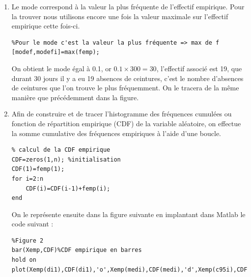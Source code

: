 \documentclass[a4paper,oneside]{article}
\begin{document}
\begin{enumerate}
\begin{lstlisting}
[maxX,maxXi]=max(Xemp); %on récupère le max des fréquence, ainsi que l'indice de ce max
[minX,minXi]=min(Xemp);
\end{lstlisting}

Nous utiliserons cet indice pour le tracer dans la figure avec la valeur maximale en abscisse, et la valeur de l'effectif empirique correspondante.
On obtient le minimum égal à 7 c'est-à-dire qu'au minimum il y a eu 7 absences de ceinture et qu'au maximum il y a eu 30 absences de ceinture de sécurité.\\

\item

Le mode correspond à la valeur la plus fréquente de l'effectif empirique.
Pour la trouver nous utilisons encore une fois la valeur maximale sur l'effectif empirique cette fois-ci.

\begin{lstlisting}
%Pour le mode c'est la valeur la plus fréquente => max de f
[modef,modefi]=max(femp);
\end{lstlisting}

On obtient le mode égal à 0.1, or $0.1\times 300 =30$, l'effectif associé est 19, que durant 30 jours il y a eu 19 absences de ceintures, c'est le nombre d'absences de ceintures que l'on trouve le plus fréquemment.
On le tracera de la même manière que précédemment dans la figure.\\

\item

Afin de construire et de tracer l'histogramme des fréquences cumulées ou fonction de répartition empirique (CDF) de la variable aléatoire, on effectue la somme cumulative des fréquences empiriques à l'aide d'une boucle.

\begin{lstlisting}
% calcul de la CDF empirique
CDF=zeros(1,n); %initialisation
CDF(1)=femp(1);
for i=2:n
    CDF(i)=CDF(i-1)+femp(i);
end
\end{lstlisting}


On le représente ensuite dans la figure suivante en implantant dans Matlab le code suivant :

\begin{lstlisting}
%Figure 2
bar(Xemp,CDF)%CDF empirique en barres
hold on
plot(Xemp(di1),CDF(di1),'o',Xemp(medi),CDF(medi),'d',Xemp(c95i),CDF(c95i),'x')
\end{lstlisting}


\end{enumerate}
\end{document}
